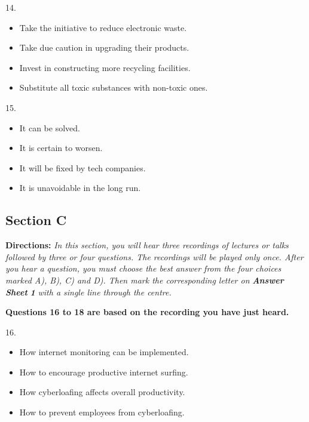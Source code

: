 \documentclass[UTF8,11pt]{ctexart}
\begin{document}
14.


\begin{itemize}[leftmargin=2em,itemsep=.2em,topsep=.4em]\item[A.] Take the initiative to reduce electronic waste.
\item[B.] Take due caution in upgrading their products.
\item[C.] Invest in constructing more recycling facilities.
\item[D.] Substitute all toxic substances with non-toxic ones.
\end{itemize}

15.


\begin{itemize}[leftmargin=2em,itemsep=.2em,topsep=.4em]\item[A.] It can be solved.
\item[B.] It is certain to worsen.
\item[C.] It will be fixed by tech companies.
\item[D.] It is unavoidable in the long run.
\end{itemize}

\subsection*{\textbf{Section C}}


\textbf{Directions:}\textit{ In this section, you will hear three recordings of lectures or talks followed by three or four} \textit{questions. The recordings will be played only once. After you hear a question, you must choose the best} \textit{answer from the four choices marked A), B), C) and D). Then mark the corresponding letter on }\textbf{\textit{Answer Sheet}} \textbf{\textit{1}}\textit{ with a single line through the centre.}


\textbf{Questions 16 to 18 are based on the recording you have just heard.}


16.


\begin{itemize}[leftmargin=2em,itemsep=.2em,topsep=.4em]\item[A.] How internet monitoring can be implemented.
\item[B.] How to encourage productive internet surfing.
\item[C.] How cyberloafing affects overall productivity.
\item[D.] How to prevent employees from cyberloafing.
\end{itemize}
\end{document}
